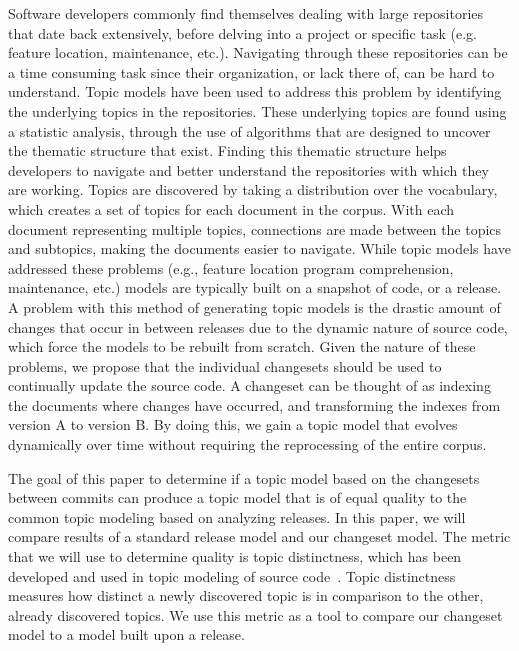 Software developers commonly find themselves dealing with large repositories that date back extensively, before delving into a project or specific task (e.g. feature location, maintenance, etc.).
Navigating through these repositories can be a time consuming task since their organization, or lack there of, can be hard to understand.
Topic models have been used to address this problem by identifying the underlying topics in the repositories.
These underlying topics are found using a statistic analysis, through the use of algorithms that are designed to uncover the thematic structure that exist.
Finding this thematic structure helps developers to navigate and better understand the repositories with which they are working.
Topics are discovered by taking a distribution over the vocabulary, which creates a set of topics for each document in the corpus.
With each document representing multiple topics, connections are made between the topics and subtopics, making the documents easier to navigate.
While topic models have addressed these problems (e.g., feature location program comprehension, maintenance, etc.) models are typically built on a snapshot of code, or a release.
A problem with this method of generating topic models is the drastic amount of changes that occur in between releases due to the dynamic nature of source code, which force the models to be rebuilt from scratch.
Given the nature of these problems, we propose that the individual changesets should be used to continually update the source code.
A changeset can be thought of as indexing the documents where changes have occurred, and transforming the indexes from version A to version B.
By doing this, we gain a topic model that evolves dynamically over time without requiring the reprocessing of the entire corpus.

The goal of this paper to determine if a topic model based on the changesets between commits can produce a topic model that is of equal quality to the common topic modeling based on analyzing releases.
In this paper, we will compare results of a standard release model and our changeset model.
The metric that we will use to determine quality is topic distinctness,
which has been developed and used in topic modeling of source
code~\cite{Wei-etal:2010, Thomas-etal:2011, Chuang-etal:2012}.
Topic distinctness measures how distinct a newly discovered topic is in
comparison to the other, already discovered topics.
We use this metric as a  tool to compare our changeset model to a model built upon a release.




